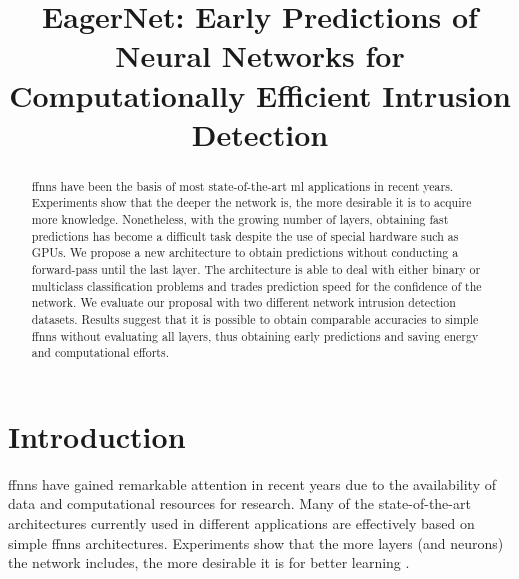 \documentclass[conference]{IEEEtran}
\begin{document}
\title{EagerNet: Early Predictions of Neural Networks for Computationally Efficient Intrusion Detection}

\author{
}



\maketitle

\begin{abstract}

\glspl{ffnn} have been the basis of most state-of-the-art \gls{ml} applications in recent years. Experiments show that the deeper the network is, the more desirable it is to acquire more knowledge. Nonetheless, with the growing number of layers, obtaining fast predictions has become a difficult task despite the use of special hardware such as GPUs. We propose a new architecture to obtain predictions without conducting a forward-pass until the last layer. The architecture is able to deal with either binary or multiclass classification problems and trades prediction speed for the confidence of the network. We evaluate our proposal with two different network intrusion detection datasets. Results suggest that it is possible to obtain comparable accuracies to simple \glspl{ffnn} without evaluating all layers, thus obtaining early predictions and saving energy and computational efforts.

\end{abstract}

\begin{IEEEkeywords}

\end{IEEEkeywords}

\section{Introduction}
\glspl{ffnn} have gained remarkable attention in recent years due to the availability of data and computational resources for research. Many of the state-of-the-art architectures currently used in different applications are effectively based on simple \glspl{ffnn} architectures. Experiments show that the more layers (and neurons) the network includes, the more desirable it is for better learning \cite{eldan_power_2016} .
\end{document}
